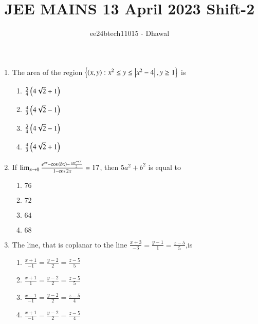 \documentclass[journal]{IEEEtran}
\theoremstyle{remark}
\begin{document}

\onecolumn

\title{JEE MAINS 13 April 2023 Shift-2}
\author{ee24btech11015 - Dhawal}
\maketitle

\renewcommand{\thefigure}{\theenumi}
\renewcommand{\thetable}{\theenumi}

\begin{enumerate}
	\item The area of the region $\left\{\left(x,y\right) : x^2 \leq y \leq \left\vert x^2 - 4\right\vert , y \geq 1 \right\}$ is


\begin{multicols}{4}
\begin{enumerate}
\item $\frac{3}{4}\left(4\sqrt{2}+1\right)$
\item $\frac{4}{3}\left(4\sqrt{2}-1\right)$
\item $\frac{3}{4}\left(4\sqrt{2}-1\right)$
\item $\frac{4}{3}\left(4\sqrt{2}+1\right)$
\end{enumerate}
\end{multicols}

	\item If $\lim_{x \to 0} \frac{e^{ax} - \cos{\ensuremath{\left(bx\right)}} - \frac{cxe^{-cx}}{2}}{1 - \cos{2x}} = 17
$, then $5a^2+b^2$ is equal to

\begin{multicols}{4}
\begin{enumerate}
\item $76$
\item $72$
\item $64$
\item $68$
\end{enumerate}
\end{multicols}

\item The line, that is coplanar to the line $\frac{x + 3}{-3} = \frac{y - 1}{1} = \frac{z - 5}{5}$,is

\begin{multicols}{4}
\begin{enumerate}
\item $\frac{x + 1}{-1} = \frac{y - 2}{2} = \frac{z - 5}{5}$
\item $\frac{x + 1}{1} = \frac{y - 2}{2} = \frac{z - 5}{5}$
\item $\frac{x - 1}{-1} = \frac{y - 2}{2} = \frac{z - 5}{4}$
\item $\frac{x + 1}{-1} = \frac{y - 2}{2} = \frac{z - 5}{4}$
\end{enumerate}
\end{multicols}


\end{enumerate}
\end{document}

